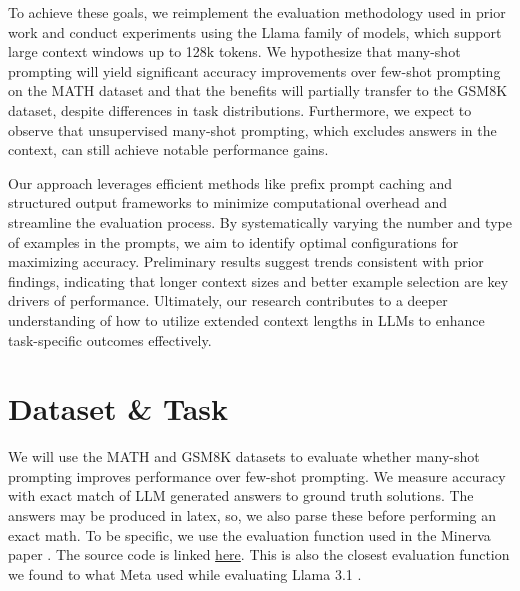 \documentclass[twocolumn,11pt]{article}
\begin{document}
To achieve these goals, we reimplement the evaluation methodology used in prior work and conduct experiments using the Llama family of models, which support large context windows up to 128k tokens. We hypothesize that many-shot prompting will yield significant accuracy improvements over few-shot prompting on the MATH dataset and that the benefits will partially transfer to the GSM8K dataset, despite differences in task distributions. Furthermore, we expect to observe that unsupervised many-shot prompting, which excludes answers in the context, can still achieve notable performance gains.

Our approach leverages efficient methods like prefix prompt caching and structured output frameworks to minimize computational overhead and streamline the evaluation process. By systematically varying the number and type of examples in the prompts, we aim to identify optimal configurations for maximizing accuracy. Preliminary results suggest trends consistent with prior findings, indicating that longer context sizes and better example selection are key drivers of performance. Ultimately, our research contributes to a deeper understanding of how to utilize extended context lengths in LLMs to enhance task-specific outcomes effectively.

\section{Dataset \& Task}

We will use the MATH \cite{cobbe2021trainingverifierssolvemath} and GSM8K \cite{cobbe2021gsm8k} datasets to evaluate whether many-shot prompting improves performance over few-shot prompting. We measure accuracy with exact match of LLM generated answers to ground truth solutions. The answers may be produced in latex, so, we also parse these before performing an exact math. To be specific, we use the evaluation function used in the Minerva paper \cite{lewkowycz2022solving}. The source code is linked \href{https://github.com/EleutherAI/lm-evaluation-harness/blob/main/lm_eval/tasks/minerva_math/utils.py}{here}. This is also the closest evaluation function we found to what Meta used while evaluating Llama 3.1 \cite{dubey2024llama3herdmodels}.

\end{document}
